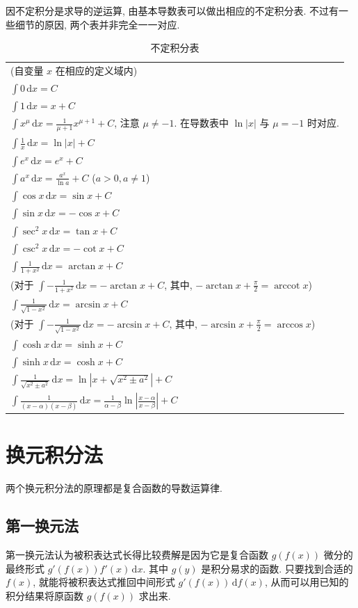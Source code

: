 \documentclass{book}
\newcommand{\dd}{\,\mathrm{d}}
\newcommand{\abs}[1]{\left\lvert #1 \right\rvert}
\DeclareMathOperator{\arccot}{arccot}
\numberwithin{equation}{section}
\numberwithin{figure}{section}
\theoremstyle{definition}
\begin{document}
因不定积分是求导的逆运算, 由基本导数表可以做出相应的不定积分表. 不过有一些细节的原因, 两个表并非完全一一对应.
\begin{table}
  \setlength\extrarowheight{9pt}
  \centering
  \caption{不定积分表}
  \label{tab:indefinite_integral}
  \begin{tabular}{l}
    \toprule
    (自变量 $x$ 在相应的定义域内)\\
    $\int 0\dd x=C$\\
    $\int 1\dd x=x+C$\\
    $\int x^\mu\dd x=\frac{1}{\mu+1}x^{\mu+1}+C$, 注意 $\mu\ne-1$. 在导数表中 $\ln \abs{x}$ 与 $\mu=-1$ 时对应.\\
    $\int \frac{1}{x}\dd x=\ln\abs{x}+C$\\
    $\int e^x\dd x=e^x+C$\\
    $\int a^x\dd x=\frac{a^x}{\ln a}+C$ \quad ($a>0,a\ne1$)\\
    $\int \cos x\dd x=\sin x+C$\\
    $\int \sin x\dd x=-\cos x+C$\\
    $\int \sec^2 x\dd x=\tan x+C$\\
    $\int \csc^2 x\dd x=-\cot x+C$\\
    $\int \frac{1}{1+x^2}\dd x=\arctan x+C$\\
    \qquad (对于 $\int -\frac{1}{1+x^2}\dd x=-\arctan x+C$, 其中, $-\arctan x+\frac{\pi}{2}=\arccot x$)\\
    $\int \frac{1}{\sqrt{1-x^2}}\dd x=\arcsin x+C$\\
    \qquad (对于 $\int -\frac{1}{\sqrt{1-x^2}}\dd x=-\arcsin x+C$, 其中, $-\arcsin x+\frac{\pi}{2}=\arccos x$)\\
    $\int\cosh x\dd x=\sinh x+C$\\
    $\int\sinh x\dd x=\cosh x+C$\\
    $\int \frac{1}{\sqrt{x^2\pm a^2}}\dd x=\ln\abs{x+\sqrt{x^2\pm a^2}}+C$\\
    $\int \frac{1}{(x-\alpha)(x-\beta)}\dd x=\frac{1}{\alpha-\beta}\ln\abs{\frac{x-\alpha}{x-\beta}}+C$\\
    \bottomrule
  \end{tabular}
\end{table}
\section{换元积分法}
两个换元积分法的原理都是复合函数的导数运算律.
\subsection{第一换元法}
第一换元法认为被积表达式长得比较费解是因为它是复合函数 $g(f(x))$ 微分的最终形式 $g'(f(x))f'(x)\dd x$. 其中 $g(y)$ 是积分易求的函数. 只要找到合适的 $f(x)$, 就能将被积表达式推回中间形式 $g'(f(x))\dd f(x)$, 从而可以用已知的积分结果将原函数 $g(f(x))$ 求出来.
\end{document}
